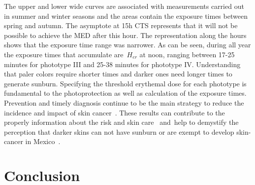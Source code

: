 \documentclass{article}
\begin{document}
{The upper and lower wide curves are associated with measurements carried
out in summer and winter seasons and the areas contain the exposure
times between spring and autumn. The asymptote at 15h CTS represents
that it will not be possible to achieve the MED after this hour. The
representation along the hours shows that the exposure time range was
narrower. As can be seen, during all year the exposure times that
accumulate are~\(H_{er}\) at noon, ranging between 17-25 minutes
for phototype III and 25-38 minutes for phototype IV. Understanding that
paler colors require shorter times and darker ones need longer times to
generate sunburn. Specifying the threshold erythemal dose for each
phototype is fundamental to the photoprotection as well as calculation
of the exposure times. Prevention and timely diagnosis continue to be
the main strategy to reduce the incidence and impact of skin
cancer~\cite{Pinedo_2009,a2016}. These results can contribute to the properly
information about the risk and skin care~\cite{Heckman2019} and~help to
demystify the perception that darker skins can not have sunburn or are
exempt to develop skin-cancer in Mexico~\cite{b2006}.~

\section*{Conclusion}

{\label{507127}}

}
\end{document}
